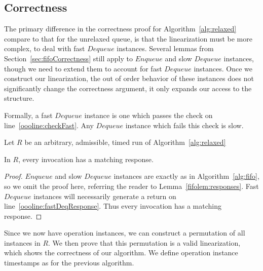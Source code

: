 \documentclass[a4paper,anonymous,USenglish]{lipics-v2021}
\theoremstyle{definition}
\begin{document}
\subsection{Correctness}
The primary difference in the correctness proof for Algorithm~\ref{alg:relaxed} compare to that for the unrelaxed queue, is that the linearization must be more complex, to deal with fast $Dequeue$ instances.  Several lemmas from Section~\ref{sec:fifoCorrectness} still apply to $Enqueue$ and slow $Dequeue$ instances, though we need to extend them to account for fast $Dequeue$ instances.  Once we construct our linearization, the out of order behavior of these instances does not significantly change the correctness argument, it only expands our access to the structure.

Formally, a fast $Dequeue$ instance is one which passes the check on line~\ref{oooline:checkFast}.  Any $Dequeue$ instance which fails this check is slow.

Let $R$ be an arbitrary, admissible, timed run of Algorithm~\ref{alg:relaxed}

\begin{lemma}
 In $R$, every invocation has a matching response.
\end{lemma}

\begin{proof}
  $Enqueue$ and slow $Dequeue$ instances are exactly as in Algorithm~\ref{alg:fifo}, so we omit the proof here, referring the reader to Lemma~\ref{fifolem:responses}.  Fast $Dequeue$ instances will necessarily generate a return on line~\ref{oooline:fastDeqResponse}.  Thus every invocation has a matching response.
\end{proof}

Since we now have operation instances, we can construct a permutation of all instances in $R$.  We then prove that this permutation is a valid linearization, which shows the correctness of our algorithm.  We define operation instance timestamps as for the previous algorithm.
\end{document}
